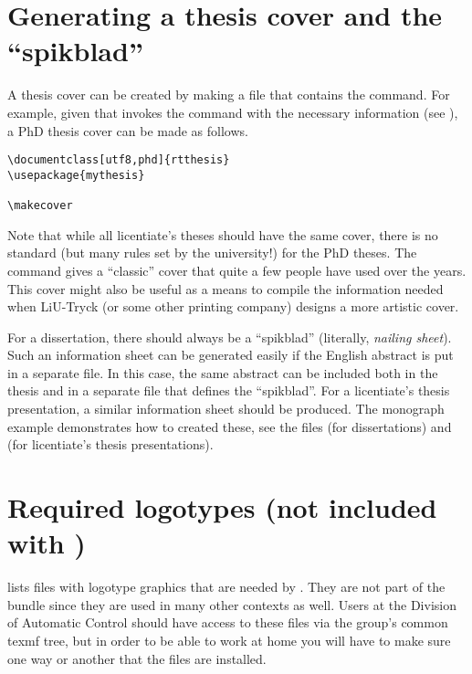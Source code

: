 \section{Generating a thesis cover and the “spikblad”}
%
A thesis cover can be created by making a file that contains the  command.  For example, given that  invokes the  command with the necessary information (see ), a PhD thesis cover can be made as follows.

\begin{minipage}{1.0\linewidth}
  \verbatimsize
\begin{verbatim}
\documentclass[utf8,phd]{rtthesis}
\usepackage{mythesis}

\makecover
\end{verbatim}
\end{minipage}

Note that while all licentiate's theses should have the same cover, there is no standard (but many rules set by the university!) for the PhD theses.  The  command gives a “classic” cover that quite a few people have used over the years.  This cover might also be useful as a means to compile the information needed when LiU-Tryck (or some other printing company) designs a more artistic cover.

For a dissertation, there should always be a “spikblad” (literally, \emph{nailing sheet}).  Such an information sheet can be generated easily if the English abstract is put in a separate file.  In this case, the same abstract can be included both in the thesis and in a separate file that defines the “spikblad”.  For a licentiate's thesis presentation, a similar information sheet should be produced.  The monograph example demonstrates how to created these, see the files  (for dissertations) and  (for licentiate's thesis presentations).


\section{Required logotypes (not included with \rtthesis)}
%
 lists files with logotype graphics that are needed by \rtthesis.  They are not part of the \rtthesis bundle since they are used in many other contexts as well.  Users at the Division of Automatic Control should have access to these files via the group's common texmf tree, but in order to be able to work at home you will have to make sure one way or another that the files are installed.


